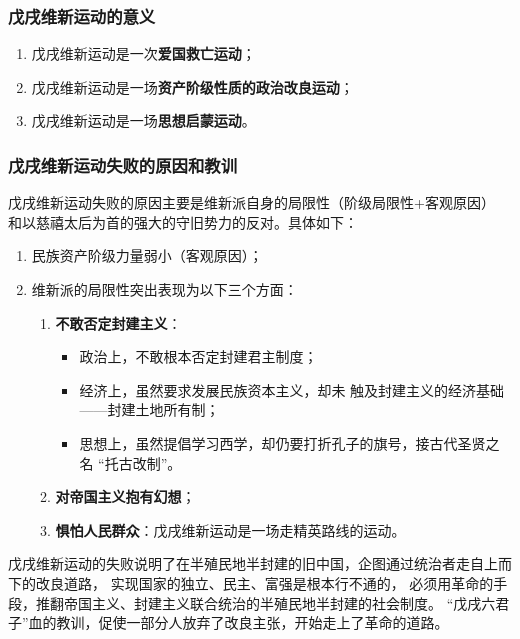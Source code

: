 \documentclass[10pt, UTF8]{book} %
\begin{document}
\subsubsection{戊戌维新运动的意义}

\begin{enumerate}[label=(\arabic*), itemsep=0pt]
    \item 戊戌维新运动是一次\textbf{爱国救亡运动}；
    \item 戊戌维新运动是一场\textbf{资产阶级性质的政治改良运动}；
    \item 戊戌维新运动是一场\textbf{思想启蒙运动}。
\end{enumerate}

\subsubsection{戊戌维新运动失败的原因和教训}

戊戌维新运动失败的原因主要是维新派自身的局限性（阶级局限性+客观原因）
和以慈禧太后为首的强大的守旧势力的反对。具体如下：
\begin{enumerate}[label=(\textup{\arabic*}), itemsep=0pt]
    \item 民族资产阶级力量弱小（客观原因）；
    \item 维新派的局限性突出表现为以下三个方面：
    \begin{enumerate}[label=\roman*., itemsep=0pt]
         \item \textbf{不敢否定封建主义}：
            \begin{itemize}[itemsep=0pt]
                \item 政治上，不敢根本否定封建君主制度；
                \item 经济上，虽然要求发展民族资本主义，却未
                触及封建主义的经济基础——封建土地所有制；
                \item 思想上，虽然提倡学习西学，却仍要打折孔子的旗号，接古代圣贤之名
                “托古改制”。
            \end{itemize}
         \item \textbf{对帝国主义抱有幻想}；
         \item \textbf{惧怕人民群众}：戊戌维新运动是一场走精英路线的运动。
    \end{enumerate}
\end{enumerate}
戊戌维新运动的失败说明了在半殖民地半封建的旧中国，企图通过统治者走自上而下的改良道路，
实现国家的独立、民主、富强是根本行不通的，
必须用革命的手段，推翻帝国主义、封建主义联合统治的半殖民地半封建的社会制度。
“戊戌六君子”血的教训，促使一部分人放弃了改良主张，开始走上了革命的道路。
\end{document}
